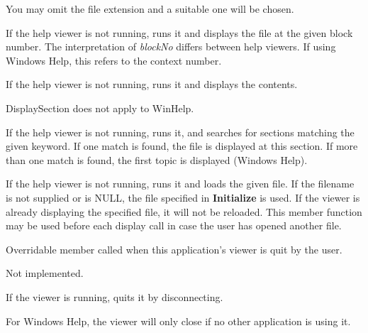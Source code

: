 You may omit the file extension and a suitable one will be chosen.

\label{wxwinhelpcontrollerdisplayblock}


If the help viewer is not running, runs it and displays the file at the given block number.
The interpretation of {\it blockNo} differs between help viewers. If using Windows Help, this
refers to the context number.

\label{wxwinhelpcontrollerdisplaycontents}


If the help viewer is not running, runs it and displays the
contents.

\label{wxwinhelpcontrollerdisplaysection}


DisplaySection does not apply to WinHelp.

\label{wxwinhelpcontrollerkeywordsearch}


If the help viewer is not running, runs it, and searches for sections matching the given keyword. If one
match is found, the file is displayed at this section. If more than one
match is found, the first topic is displayed (Windows Help).

\label{wxwinhelpcontrollerloadfile}


If the help viewer is not running, runs it and loads the given file.
If the filename is not supplied or is
NULL, the file specified in {\bf Initialize} is used. If the viewer is
already displaying the specified file, it will not be reloaded. This
member function may be used before each display call in case the user
has opened another file.

\label{wxwinhelpcontrolleronquit}


Overridable member called when this application's viewer is quit by the user.

Not implemented.

\label{wxwinhelpcontrollerquit}


If the viewer is running, quits it by disconnecting.

For Windows Help, the viewer will only close if no other application is using it.

